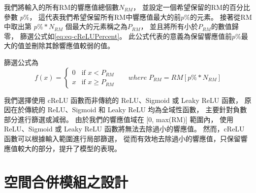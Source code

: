 \documentclass[class=NCU_thesis, crop=false]{standalone}
\begin{document}
	我們將輸入的所有RM的響應值總個數$N_{RM}$，
	並設定一個希望保留的RM的百分比參數 $p\%$，
	這代表我們希望保留所有RM中響應值最大的前$p\%$的元素。
	接著從RM中取出第 $p\% * N_{RM}$  個最大的元素稱之為$P_{RM}$，
	並且將所有小於$P_{RM}$的數值歸零，
	篩選公式如\cref{eq:eq-cReLUPercent}。
	此公式代表的意義為保留響應值前$p\%$最大的值並刪除其餘響應值較弱的值。
	
	篩選公式為\\
	\begin{equation}
	    \label{eq:eq-cReLUPercent}
	    f(x)= 
	    \begin{cases}
	        0 & \text{if  $x < P_{RM}$ }\\
	        x & \text{if  $x \geq P_{RM}$}
	    \end{cases} \quad where \; P_{RM} = RM\left[ p\% * N_{RM} \right]
	\end{equation}

	我們選擇使用 cReLU 函數而非傳統的 ReLU、Sigmoid 或 Leaky ReLU 函數，
	原因在於傳統的 ReLU、Sigmoid 和 Leaky ReLU 均為全域性函數，
	主要針對負數部分進行篩選或減弱。
	由於我們的響應值域在 [0, max(RM)] 範圍內，
	使用 ReLU、Sigmoid 或 Leaky ReLU 函數將無法去除過小的響應值。
	然而，cReLU 函數可以根據輸入範圍進行局部篩選，
	從而有效地去除過小的響應值，只保留響應值較大的部分，提升了模型的表現。

\pagebreak

\section{空間合併模組之設計}
		

\end{document}
